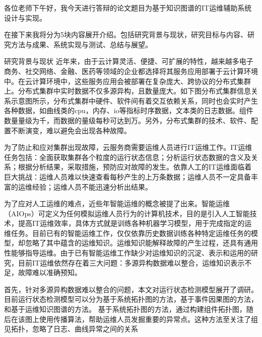 各位老师下午好，我今天进行答辩的论文题目为基于知识图谱的IT运维辅助系统设计与实现。
\par
在接下来我将分为5块内容展开介绍。包括研究背景与现状，研究目标与内容、研究方法与成果、系统实现与测试、总结与展望。

研究背景与现状
近年来，由于云计算灵活、便捷、可扩展的特性，越来越多电子商务、社交网络、金融、医药等领域的企业都选择将其服务应用部署于云计算环境中。在云计算环境中，这些服务应用会被部署在复杂庞大、跨协议的分布式集群上。分布式集群中实时数据不仅多源异构，且数量庞大。如下图分布式集群信息关系示意图所示，分布式集群中硬件、软件间有着交互依赖关系，同时也会实时产生各种数据，如曲线类的cpu，内存、io等指标时序数据，文本类的日志数据。组件数量量级为千，而数据的量级每秒可达到万。另外，分布式集群的技术、软件、配置不断演变，难以避免会出现各种故障。

为了防止和应对集群出现故障，云服务商需要运维人员进行IT运维工作。IT运维任务包括：全面获取集群各个粒度的运行状态信息；分析运行状态数据的含义及关系；根据分析结果，采取措施，预防应对故障的发生。依靠人工的IT运维面临着巨大挑战：运维人员难以快速查看每秒产生的上万条数据；运维人员不一定具备丰富的运维经验；运维人员不能迅速分析出结果。

为了应对人工运维的难点，近些年智能运维的概念被提了出来。智能运维（AIOps）可定义为任何模拟运维人员行为的计算机技术，目的是引入人工智能技术，提高IT运维效率，具体方式就是训练各种机器学习模型，用于完成指定的运维任务。目前已有的智能运维工作，仅仅依靠历史数据训练各种特定运维任务的模型，却忽略了其中蕴含的运维知识。运维知识能解释故障的产生过程，还具有通用性能够指导运维。由于已有智能运维工作缺少对运维知识的沉淀、表示和运用的研究，目前IT运维依然存在着三大问题：多源异构数据难以整合，运维知识表示不足，故障难以准确预知。

首先，针对多源异构数据难以整合的问题，本文对运行状态检测模型展开了调研。目前运行状态检测模型可以分为基于系统拓扑图的方法，基于事件因果图的方法，和基于运维知识图谱的方法。
基于系统拓扑图的方法，通过构建组件拓扑图，随后在该图上使用传播算法，帮助运维人员发掘重要的异常点。这种方法至关注了组见拓扑，忽略了日志、曲线异常之间的关系
